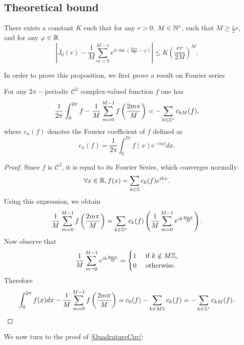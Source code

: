 \documentclass{article}
\begin{document}
\subsection{Theoretical bound}
\begin{Theorem} There exists a constant $K$ such that for any $r>0$, $M\in \mathbb{N}^*$, such that $M \geq \frac{e}{2}r$, and for any $\varphi \in \mathbb{R}$ 
	\[\left|J_0(r) -  \dfrac{1}{M}\sum_{m=0}^{M-1}e^{ir\sin\left(\frac{2m\pi}{M}-\varphi\right)} \right| \leq K \left(\dfrac{er}{2M}\right)^M.\]
	\label{QuadratureCirc}
\end{Theorem}
\noindent In order to prove this proposition, we first prove a result on Fourier series
\begin{lemma} For any $2\pi-$periodic $\mathcal{C}^2$ complex-valued function $f$ one has 
	\[\dfrac{1}{2\pi}\int_{0}^{2\pi}f - \dfrac{1}{M}\sum_{m=0}^{M-1}f\left(\frac{2m\pi}{M} \right) = - \sum\limits_{k \in \mathbb{Z}^*}c_{kM}(f),\]
	where $c_n(f)$ denotes the Fourier coefficient of $f$ defined as 
	\[c_n(f) = \dfrac{1}{2\pi}\int_{0}^{2\pi}f(x)e^{-inx}dx.\]
\end{lemma}
\begin{proof}
	Since $f$ is $\mathcal{C}^2$, it is equal to its Fourier Series, which converges normally: \[\forall x \in \mathbb{R}, f(x) = \sum_{k\in\mathbb{Z}} c_k(f)e^{ikx}.\] Using this expression, we obtain \[\dfrac{1}{M}\sum_{m=0}^{M-1}f\left(\frac{2m\pi}{M}\right) = \sum\limits_{k\in \mathbb{Z}^*}c_k(f)\left(\frac{1}{M}\sum_{m=0}^{M-1}e^{ik\frac{2m\pi}{M}}\right).\] 
	Now observe that
	\[\dfrac{1}{M}\sum_{m=0}^{M-1}e^{ik\frac{2m\pi}{M}} =   \begin{cases}
	1 &\text{ if } k \notin M\mathbb{Z}, \\
	0 &\text{ otherwise.}
	\end{cases}\] 
	Therefore \[\int_{0}^{2\pi}f(x)dx - \dfrac{1}{M}\sum_{m=0}^{M-1}f\left(\frac{2m\pi}{M} \right) = c_0(f) - \sum\limits_{k \in M\mathbb{Z}}c_{k}(f) = - \sum\limits_{k \in \mathbb{Z}^*}c_{kM}(f).\]
	
\end{proof}
\noindent We now turn to the proof of \autoref{QuadratureCirc}: 
\end{document}
